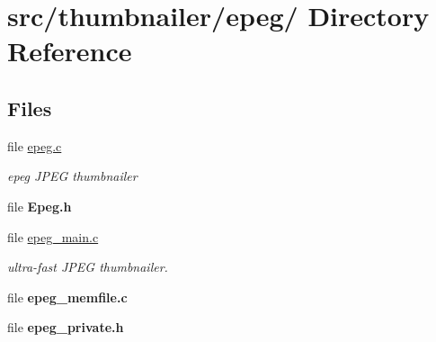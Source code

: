 \hypertarget{dir_000018}{
\section{src/thumbnailer/epeg/ Directory Reference}
\label{dir_000018}
}
\subsection*{Files}
\begin{CompactItemize}
\item 
file \hyperlink{epeg_8c}{epeg.c}
\begin{CompactList}\small\item\em epeg JPEG thumbnailer \item\end{CompactList}

\item 
file {\bf Epeg.h}
\item 
file \hyperlink{epeg__main_8c}{epeg\_\-main.c}
\begin{CompactList}\small\item\em ultra-fast JPEG thumbnailer. \item\end{CompactList}

\item 
file {\bf epeg\_\-memfile.c}
\item 
file {\bf epeg\_\-private.h}
\end{CompactItemize}

